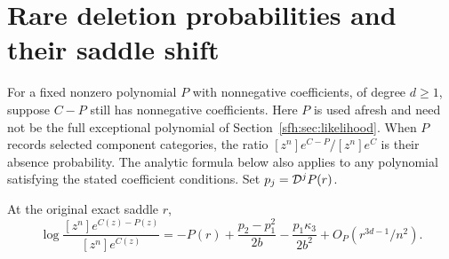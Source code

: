 \section{Rare deletion probabilities and their saddle shift}\label{sfh:sec:deletion}
For a fixed nonzero polynomial $P$ with nonnegative coefficients, of degree $d\ge1$, suppose $C-P$ still has nonnegative coefficients. Here $P$ is used afresh and need not be the full exceptional polynomial of Section~\ref{sfh:sec:likelihood}. When $P$ records selected component categories, the ratio $[z^n]e^{C-P}/[z^n]e^C$ is their absence probability. The analytic formula below also applies to any polynomial satisfying the stated coefficient conditions. Set $p_j=\mathcal D^jP(r)$.

\begin{theorem}\label{sfh:thm:deletion}
At the original exact saddle $r$,
\begin{equation}\label{sfh:eq:deletion}
 \log\frac{[z^n]e^{C(z)-P(z)}}{[z^n]e^{C(z)}}
 =-P(r)+\frac{p_2-p_1^2}{2b}
       -\frac{p_1\kappa_3}{2b^2}
       +O_P(r^{3d-1}/n^2).
\end{equation}
\end{theorem}
